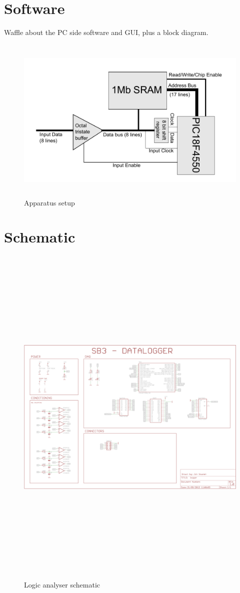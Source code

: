 \documentclass[11pt]{article}
\begin{document}
\section{Software}
    Waffle about the PC side software and GUI, plus a block diagram.
    
    \begin{figure}
    \centering
    \includegraphics[height=8cm]{block_diagram.pdf}
    \caption{Apparatus setup}
    \label{fig:app}
    \end{figure}
	
\appendix
\appendixpage
\addappheadtotoc
\section{Schematic}
\label{app-schematic}
			
    \begin{figure}
    \centering
    \includegraphics[height=17cm,angle=90]{../../hardware/schematic.png}
    \caption{Logic analyser schematic}
    \label{fig:sch}
    \end{figure}
\end{document}
